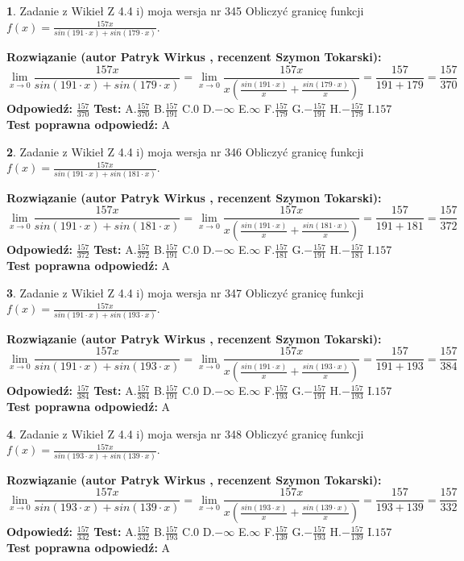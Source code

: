 \documentclass[12pt, a4paper]{article}
\theoremstyle{definition} %
\newtheorem{zad}{}
\newcommand{\zadStart}[1]{\begin{zad}#1\newline}
\newcommand{\zadStop}{\end{zad}}
\newcommand{\rozwStart}[2]{\noindent \textbf{Rozwiązanie (autor #1 , recenzent #2): }\newline}
\newcommand{\rozwStop}{\newline}
\newcommand{\odpStart}{\noindent \textbf{Odpowiedź:}\newline}
\newcommand{\odpStop}{\newline}
\newcommand{\testStart}{\noindent \textbf{Test:}\newline}
\newcommand{\testStop}{\newline}
\newcommand{\kluczStart}{\noindent \textbf{Test poprawna odpowiedź:}\newline}
\newcommand{\kluczStop}{\newline}
\begin{document}
\zadStart{Zadanie z Wikieł Z 4.4 i) moja wersja nr 345}
Obliczyć granicę funkcji $f(x)=\frac{157x}{sin(191\cdot x) +sin(179\cdot x)}$.
\zadStop
\rozwStart{Patryk Wirkus}{Szymon Tokarski}
$$\lim\limits_{x\to 0}\frac{157x}{sin(191\cdot x) +sin(179\cdot x)}=\lim\limits_{x\to 0}\frac{157x}{x(\frac{sin(191\cdot x)}{x}+\frac{sin(179\cdot x)}{x})}=\frac{157}{191+179} = \frac{157}{370}$$
\rozwStop
\odpStart
$\frac{157}{370}$
\odpStop
\testStart
A.$\frac{157}{370}$
B.$\frac{157}{191}$
C.$0$
D.$-\infty$
E.$\infty$
F.$\frac{157}{179}$
G.$-\frac{157}{191}$
H.$-\frac{157}{179}$
I.$157$
\testStop
\kluczStart
A
\kluczStop



\zadStart{Zadanie z Wikieł Z 4.4 i) moja wersja nr 346}
Obliczyć granicę funkcji $f(x)=\frac{157x}{sin(191\cdot x) +sin(181\cdot x)}$.
\zadStop
\rozwStart{Patryk Wirkus}{Szymon Tokarski}
$$\lim\limits_{x\to 0}\frac{157x}{sin(191\cdot x) +sin(181\cdot x)}=\lim\limits_{x\to 0}\frac{157x}{x(\frac{sin(191\cdot x)}{x}+\frac{sin(181\cdot x)}{x})}=\frac{157}{191+181} = \frac{157}{372}$$
\rozwStop
\odpStart
$\frac{157}{372}$
\odpStop
\testStart
A.$\frac{157}{372}$
B.$\frac{157}{191}$
C.$0$
D.$-\infty$
E.$\infty$
F.$\frac{157}{181}$
G.$-\frac{157}{191}$
H.$-\frac{157}{181}$
I.$157$
\testStop
\kluczStart
A
\kluczStop



\zadStart{Zadanie z Wikieł Z 4.4 i) moja wersja nr 347}
Obliczyć granicę funkcji $f(x)=\frac{157x}{sin(191\cdot x) +sin(193\cdot x)}$.
\zadStop
\rozwStart{Patryk Wirkus}{Szymon Tokarski}
$$\lim\limits_{x\to 0}\frac{157x}{sin(191\cdot x) +sin(193\cdot x)}=\lim\limits_{x\to 0}\frac{157x}{x(\frac{sin(191\cdot x)}{x}+\frac{sin(193\cdot x)}{x})}=\frac{157}{191+193} = \frac{157}{384}$$
\rozwStop
\odpStart
$\frac{157}{384}$
\odpStop
\testStart
A.$\frac{157}{384}$
B.$\frac{157}{191}$
C.$0$
D.$-\infty$
E.$\infty$
F.$\frac{157}{193}$
G.$-\frac{157}{191}$
H.$-\frac{157}{193}$
I.$157$
\testStop
\kluczStart
A
\kluczStop



\zadStart{Zadanie z Wikieł Z 4.4 i) moja wersja nr 348}
Obliczyć granicę funkcji $f(x)=\frac{157x}{sin(193\cdot x) +sin(139\cdot x)}$.
\zadStop
\rozwStart{Patryk Wirkus}{Szymon Tokarski}
$$\lim\limits_{x\to 0}\frac{157x}{sin(193\cdot x) +sin(139\cdot x)}=\lim\limits_{x\to 0}\frac{157x}{x(\frac{sin(193\cdot x)}{x}+\frac{sin(139\cdot x)}{x})}=\frac{157}{193+139} = \frac{157}{332}$$
\rozwStop
\odpStart
$\frac{157}{332}$
\odpStop
\testStart
A.$\frac{157}{332}$
B.$\frac{157}{193}$
C.$0$
D.$-\infty$
E.$\infty$
F.$\frac{157}{139}$
G.$-\frac{157}{193}$
H.$-\frac{157}{139}$
I.$157$
\testStop
\kluczStart
A
\kluczStop
\end{document}
